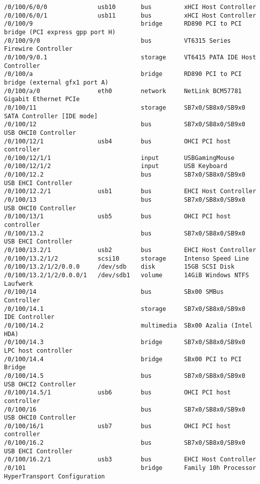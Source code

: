 \begin{small}
\begin{verbatim}
/0/100/6/0/0              usb10       bus         xHCI Host Controller
/0/100/6/0/1              usb11       bus         xHCI Host Controller
/0/100/9                              bridge      RD890 PCI to PCI bridge (PCI express gpp port H)
/0/100/9/0                            bus         VT6315 Series Firewire Controller
/0/100/9/0.1                          storage     VT6415 PATA IDE Host Controller
/0/100/a                              bridge      RD890 PCI to PCI bridge (external gfx1 port A)
/0/100/a/0                eth0        network     NetLink BCM57781 Gigabit Ethernet PCIe
/0/100/11                             storage     SB7x0/SB8x0/SB9x0 SATA Controller [IDE mode]
/0/100/12                             bus         SB7x0/SB8x0/SB9x0 USB OHCI0 Controller
/0/100/12/1               usb4        bus         OHCI PCI host controller
/0/100/12/1/1                         input       USBGamingMouse
/0/100/12/1/2                         input       USB Keyboard
/0/100/12.2                           bus         SB7x0/SB8x0/SB9x0 USB EHCI Controller
/0/100/12.2/1             usb1        bus         EHCI Host Controller
/0/100/13                             bus         SB7x0/SB8x0/SB9x0 USB OHCI0 Controller
/0/100/13/1               usb5        bus         OHCI PCI host controller
/0/100/13.2                           bus         SB7x0/SB8x0/SB9x0 USB EHCI Controller
/0/100/13.2/1             usb2        bus         EHCI Host Controller
/0/100/13.2/1/2           scsi10      storage     Intenso Speed Line
/0/100/13.2/1/2/0.0.0     /dev/sdb    disk        15GB SCSI Disk
/0/100/13.2/1/2/0.0.0/1   /dev/sdb1   volume      14GiB Windows NTFS Laufwerk
/0/100/14                             bus         SBx00 SMBus Controller
/0/100/14.1                           storage     SB7x0/SB8x0/SB9x0 IDE Controller
/0/100/14.2                           multimedia  SBx00 Azalia (Intel HDA)
/0/100/14.3                           bridge      SB7x0/SB8x0/SB9x0 LPC host controller
/0/100/14.4                           bridge      SBx00 PCI to PCI Bridge
/0/100/14.5                           bus         SB7x0/SB8x0/SB9x0 USB OHCI2 Controller
/0/100/14.5/1             usb6        bus         OHCI PCI host controller
/0/100/16                             bus         SB7x0/SB8x0/SB9x0 USB OHCI0 Controller
/0/100/16/1               usb7        bus         OHCI PCI host controller
/0/100/16.2                           bus         SB7x0/SB8x0/SB9x0 USB EHCI Controller
/0/100/16.2/1             usb3        bus         EHCI Host Controller
/0/101                                bridge      Family 10h Processor HyperTransport Configuration

\end{verbatim}
\end{small}
